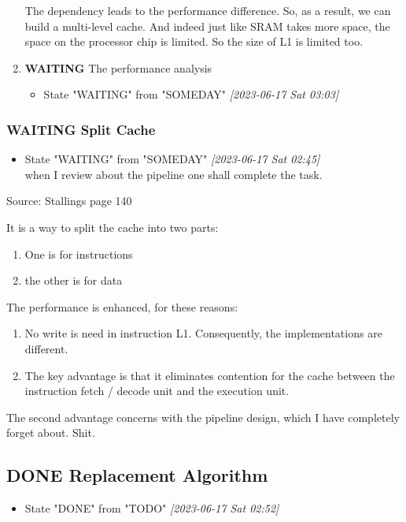 \documentclass[11pt]{article}
\begin{document}
\begin{enumerate}
The dependency leads to the performance difference. So, as a result, we can build a multi-level cache. And indeed just like SRAM takes more space, the space on the processor chip is limited. So the size of L1 is limited too.

\item {\bfseries\sffamily WAITING} The performance analysis
\label{sec:orga06c29e}
\begin{itemize}
\item State "WAITING"    from "SOMEDAY"    \textit{[2023-06-17 Sat 03:03]}
\end{itemize}
\end{enumerate}
\subsubsection{{\bfseries\sffamily WAITING} Split Cache}
\label{sec:org72f6b00}
\begin{itemize}
\item State "WAITING"    from "SOMEDAY"    \textit{[2023-06-17 Sat 02:45] } \\
when I review about the pipeline one shall complete the task.
\end{itemize}
Source: Stallings page 140

It is a way to split the cache into two parts: 
\begin{enumerate}
\item One is for instructions
\item the other is for data
\end{enumerate}

The performance is enhanced, for these reasons: 
\begin{enumerate}
\item No write is need in instruction L1. Consequently, the implementations are different.
\item The key advantage is that it eliminates contention for the cache between the instruction fetch / decode unit and the execution unit.
\end{enumerate}

The second advantage concerns with the pipeline design, which I have completely forget about. Shit.

\subsection{{\bfseries\sffamily DONE} Replacement Algorithm}
\label{sec:org992139a}
\begin{itemize}
\item State "DONE"       from "TODO"       \textit{[2023-06-17 Sat 02:52]}
\end{itemize}
\end{document}
